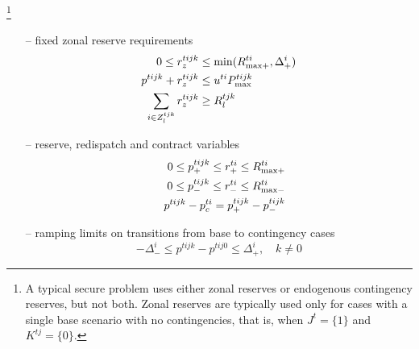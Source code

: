 \documentclass[12pt]{article}
\numberwithin{equation}{section}
\numberwithin{table}{section}
\numberwithin{figure}{section}
\begin{document}
\footnote{A typical secure problem uses either zonal reserves or endogenous contingency reserves, but not both. Zonal reserves are typically used only for cases with a single base scenario with no contingencies, that is, when $J^t = \{1\}$ and $K^{tj} = \{0\}$.}

\begin{itemize}
\item[--] fixed zonal reserve requirements
\begin{align}
0 \le r_z^{tijk} &\le \min(R_{\rm max+}^{ti}, \Delta_+^i) \label{eq:reserve_var2} \\
p^{tijk} + r_z^{tijk} &\le u^{ti} P_{\rm max}^{tijk} \label{eq:Pg_plus_R2} \\
\sum_{i \in Z_l^{tjk}} r_z^{tijk} &\ge R_l^{tjk} \label{eq:reserve_req2}
\end{align}
\end{itemize}

\footnotemark[\value{footnote}]
\begin{itemize}
\item[--] reserve, redispatch and contract variables
\begin{eqnarray}
 & &  0 \leq p_+^{tijk} \leq r_+^{ti} \leq R_{\rm max+}^{ti} \label{eq:firstinterflow}\label{eq:maxresp} \\
 & &  0 \leq p_-^{tijk} \leq r_-^{ti} \leq R_{\rm max-}^{ti} \label{eq:maxresm} \\
 & &  p^{tijk} - p_c^{ti} = p_+^{tijk} - p_-^{tijk}
\end{eqnarray}
\item[--] ramping limits on transitions from base to contingency cases
\begin{equation}
   -\Delta_-^i \leq p^{tijk} -p^{tij0} \leq \Delta_+^i, \quad k \neq 0
   \label{eq:lastnonintertemp}
\end{equation}
\end{itemize}
\end{document}
